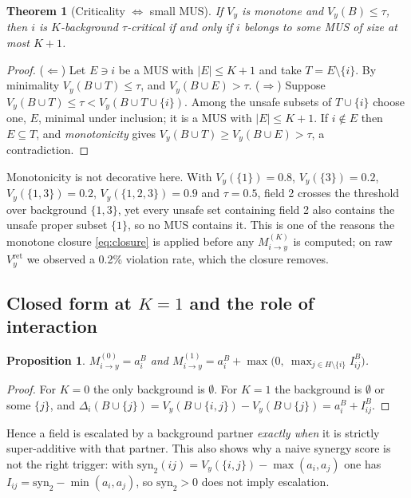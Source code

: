 \documentclass[preprint,12pt]{elsarticle}
\newtheorem{theorem}{Theorem}
\newtheorem{proposition}{Proposition}
\newcommand{\Vy}{V_{y}}
\newcommand{\Mik}{M^{(K)}_{i \to y}}
\begin{document}
\begin{theorem}[Criticality $\iff$ small MUS]\label{thm:mus}
If $\Vy$ is monotone and $\Vy(B)\le\tau$, then $i$ is $K$-background $\tau$-critical if and
only if $i$ belongs to some MUS of size at most $K+1$.
\end{theorem}
\begin{proof}
($\Leftarrow$) Let $E \ni i$ be a MUS with $|E|\le K+1$ and take $T=E\setminus\{i\}$. By
minimality $\Vy(B\cup T)\le\tau$, and $\Vy(B\cup E)>\tau$.
($\Rightarrow$) Suppose $\Vy(B\cup T)\le\tau<\Vy(B\cup T\cup\{i\})$. Among the unsafe
subsets of $T\cup\{i\}$ choose one, $E$, minimal under inclusion; it is a MUS with
$|E|\le K+1$. If $i\notin E$ then $E\subseteq T$, and \emph{monotonicity} gives
$\Vy(B\cup T)\ge \Vy(B\cup E)>\tau$, a contradiction.
\end{proof}

Monotonicity is not decorative here. With $\Vy(\{1\})=0.8$, $\Vy(\{3\})=0.2$,
$\Vy(\{1,3\})=0.2$, $\Vy(\{1,2,3\})=0.9$ and $\tau=0.5$, field 2 crosses the threshold over
background $\{1,3\}$, yet every unsafe set containing field 2 also contains the unsafe
proper subset $\{1\}$, so no MUS contains it. This is one of the reasons the monotone
closure \eqref{eq:closure} is applied before any $\Mik$ is computed; on raw
$\Vy^{\mathrm{ret}}$ we observed a 0.2\% violation rate, which the closure removes.

\subsection{Closed form at $K=1$ and the role of interaction}
\begin{proposition}\label{prop:k1}
$M^{(0)}_{i\to y}=a^{B}_{i}$ and
$M^{(1)}_{i\to y}=a^{B}_{i}+\max\big(0,\ \max_{j \in H\setminus\{i\}} I^{B}_{ij}\big)$.
\end{proposition}
\begin{proof}
For $K=0$ the only background is $\emptyset$. For $K=1$ the background is $\emptyset$ or
some $\{j\}$, and $\Delta_i(B\cup\{j\})=\Vy(B\cup\{i,j\})-\Vy(B\cup\{j\})=a^{B}_{i}+I^{B}_{ij}$.
\end{proof}

Hence a field is escalated by a background partner \emph{exactly when} it is strictly
super-additive with that partner. This also shows why a naive synergy score is not the right
trigger: with $\mathrm{syn}_2(ij)=\Vy(\{i,j\})-\max(a_i,a_j)$ one has
$I_{ij}=\mathrm{syn}_2-\min(a_i,a_j)$, so $\mathrm{syn}_2>0$ does not imply escalation.
\end{document}
